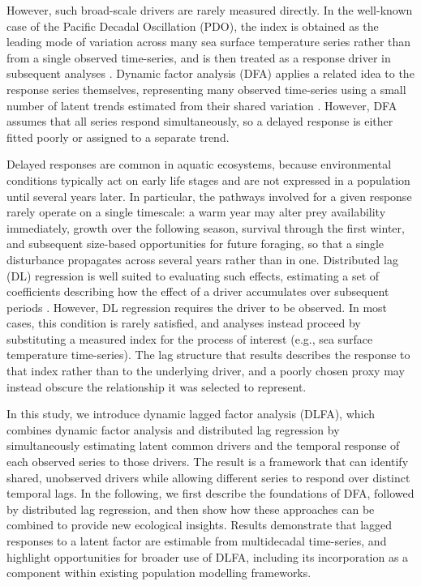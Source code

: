 \documentclass[12pt]{article}
\begin{document}
However, such broad-scale drivers are rarely measured directly. In the
well-known case of the Pacific Decadal Oscillation (PDO), the index is
obtained as the leading mode of variation across many sea surface
temperature series rather than from a single observed time-series, and
is then treated as a response driver in subsequent analyses
\citep{mantua_1997}. Dynamic factor analysis (DFA) applies a related
idea to the response series themselves, representing many observed
time-series using a small number of latent trends estimated from their
shared variation \citep{zuur_estimating_2003, zuur_dynamic_2003,
holmes_2012}. However, DFA assumes that all series respond
simultaneously, so a delayed response is either fitted poorly or
assigned to a separate trend.

Delayed responses are common in aquatic ecosystems, because
environmental conditions typically act on early life stages and are not
expressed in a population until several years later. In particular, the
pathways involved for a given response rarely operate on a single
timescale: a warm year may alter prey availability immediately, growth
over the following season, survival through the first winter, and
subsequent size-based opportunities for future foraging, so that a
single disturbance propagates across several years rather than in one.
Distributed lag (DL) regression is well suited to evaluating such
effects, estimating a set of coefficients describing how the effect of a
driver accumulates over subsequent periods \citep{clark_dynamic_2023}. However, DL
regression requires the driver to be observed. In most cases, this
condition is rarely satisfied, and analyses instead proceed by
substituting a measured index for the process of interest (e.g., sea
surface temperature time-series). The lag structure that results
describes the response to that index rather than to the underlying
driver, and a poorly chosen proxy may instead obscure the relationship
it was selected to represent.

In this study, we introduce dynamic lagged factor analysis (DLFA),
which combines dynamic factor analysis and distributed lag regression by
simultaneously estimating latent common drivers and the temporal
response of each observed series to those drivers. The result is a
framework that can identify shared, unobserved drivers while allowing
different series to respond over distinct temporal lags. In the
following, we first describe the foundations of DFA, followed by
distributed lag regression, and then show how these approaches can be
combined to provide new ecological insights. Results demonstrate that
lagged responses to a latent factor are estimable from multidecadal
time-series, and highlight opportunities for broader use of DLFA,
including its incorporation as a component within existing population
modelling frameworks.
\end{document}
